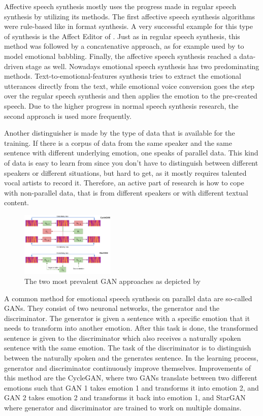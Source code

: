 \documentclass[11pt]{article}
\begin{document}
Affective speech synthesis mostly uses the progress made in regular speech synthesis by utilizing its methods. The first affective speech synthesis algorithms were rule-based like in format synthesis. A very successful example for this type of synthesis is the Affect Editor of \cite{cahn_generation_2000}. Just as in regular speech synthesis, this method was followed by a concatenative approach, as for example used by \cite{pierre-yves_production_2003} to model emotional babbling. Finally, the affective speech synthesis reached a data-driven stage as well.
Nowadays emotional speech synthesis has two predominating methods. Text-to-emotional-features synthesis tries to extract the emotional utterances directly from the text, while emotional voice conversion goes the step over the regular speech synthesis and then applies the emotion to the pre-created speech. Due to the higher progress in normal speech synthesis research, the second approach is used more frequently.

Another distinguisher is made by the type of data that is available for the training. If there is a corpus of data from the same speaker and the same sentence with different underlying emotion, one speaks of parallel data. This kind of data is easy to learn from since you don’t have to distinguish between different speakers or different situations, but hard to get, as it mostly requires talented vocal artists to record it. Therefore, an active part of research is how to cope with non-parallel data, that is from different speakers or with different textual content.

\begin{figure}[h]
 \centering
\includegraphics[width=0.4\textwidth]{"Bilder/GAN.PNG"}
\caption{The two most prevalent GAN approaches as depicted by \cite{triantafyllopoulos_overview_2023}}
\end{figure}

A common method for emotional speech synthesis on parallel data are so-called GANs. They consist of two neuronal networks, the generator and the discriminator. The generator is given a sentence with a specific emotion that it needs to transform into another emotion. After this task is done, the transformed sentence is given to the discriminator which also receives a naturally spoken sentence with the same emotion. The task of the discriminator is to distinguish between the naturally spoken and the generates sentence. In the learning process, generator and discriminator continuously improve themselves. Improvements of this method are the CycleGAN, where two GANs translate between two different emotions such that GAN 1 takes emotion 1 and transforms it into emotion 2, and GAN 2 takes emotion 2 and transforms it back into emotion 1, and StarGAN where generator and discriminator are trained to work on multiple domains.
\end{document}
